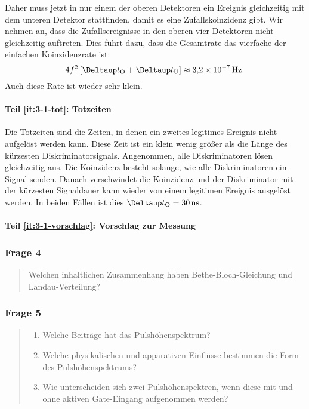 \documentclass[11pt, ngerman, fleqn, DIV=15, headinclude, BCOR=2cm]{scrreprt}
\begin{document}
Daher muss jetzt in nur einem der oberen Detektoren ein Ereignis gleichzeitig
mit dem unteren Detektor stattfinden, damit es eine Zufallskoinzidenz gibt. Wir
nehmen an, dass die Zufallsereignisse in den oberen vier Detektoren nicht
gleichzeitig auftreten. Dies führt dazu, dass die Gesamtrate das vierfache der
einfachen Koinzidenzrate ist:
\[
    4 f^2 \sbr{\DtO + \DtU} \approx \SI{3.2e-7}{\hertz}.
\]
Auch diese Rate ist wieder sehr klein.

\paragraph{Teil \ref{it:3-1-tot}: Totzeiten}

Die Totzeiten sind die Zeiten, in denen ein zweites legitimes Ereignis nicht
aufgelöst werden kann. Diese Zeit ist ein klein wenig größer als die Länge des
kürzesten Diskriminatorsignals. Angenommen, alle Diskriminatoren lösen
gleichzeitig aus. Die Koinzidenz besteht solange, wie alle Diskriminatoren ein
Signal senden. Danach verschwindet die Koinzidenz und der Diskriminator mit der
kürzesten Signaldauer kann wieder von einem legitimen Ereignis ausgelöst
werden. In beiden Fällen ist dies $\DtO = \SI{30}{\nano\second}$.

\paragraph{Teil \ref{it:3-1-vorschlag}: Vorschlag zur Messung}


\subsubsection{Frage 4}

\begin{quote}
    Welchen inhaltlichen Zusammenhang haben Bethe-Bloch-Gleichung und
    Landau-Verteilung?
\end{quote}


\subsubsection{Frage 5}

\begin{quote}
    \begin{enumerate}
        \item
            \label{it:1-5-beitrag}
            Welche Beiträge hat das Pulshöhenspektrum?

        \item
            \label{it:1-5-einfluss}
            Welche physikalischen und apparativen Einflüsse bestimmen die Form
            des Pulshöhenspektrums?

        \item
            \label{it:1-5-unterschied}
            Wie unterscheiden sich zwei Pulshöhenspektren, wenn diese mit und
            ohne aktiven Gate-Eingang aufgenommen werden?
    \end{enumerate}
\end{quote}
\end{document}
